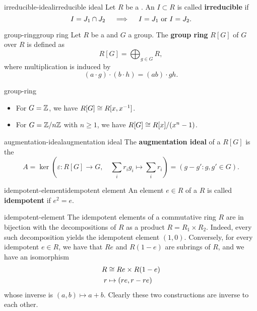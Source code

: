 \begin{topic}{irreducible-ideal}{irreducible ideal}
    Let $R$ be a . An  $I \subset R$ is called \textbf{irreducible} if
    \[ I = J_1 \cap J_2 \quad \implies \quad I = J_1 \textup{ or } I = J_2 . \]
\end{topic}

\begin{topic}{group-ring}{group ring}
    Let $R$ be a  and $G$ a group. The \textbf{group ring} $R[G]$ of $G$ over $R$ is defined as
    \[ R[G] = \bigoplus_{g \in G} R , \]
    where multiplication is induced by
    \[ (a \cdot g) \cdot (b \cdot h) = (ab) \cdot gh . \]
\end{topic}

\begin{example}{group-ring}
    \begin{itemize}
        \item For $G = \mathbb{Z}$, we have $R[G] \cong R[x, x^{-1}]$.
        \item For $G = \mathbb{Z}/n\mathbb{Z}$ with $n \ge 1$, we have $R[G] \cong R[x] / (x^n - 1)$.
    \end{itemize}
\end{example}

\begin{topic}{augmentation-ideal}{augmentation ideal}
    The \textbf{augmentation ideal} of a  $R[G]$ is the 
    \[ A = \ker\left( \varepsilon : R[G] \to G, \quad \sum_i r_i g_i \mapsto \sum_i r_i  \right) = (g - g' : g, g' \in G). \]
\end{topic}

\begin{topic}{idempotent-element}{idempotent element}
    An element $e \in R$ of a  $R$ is called \textbf{idempotent} if $e^2 = e$.
\end{topic}

\begin{example}{idempotent-element}
    The idempotent elements of a commutative ring $R$ are in bijection with the decompositions of $R$ as a product $R = R_1 \times R_2$. Indeed, every such decomposition yields the idempotent element $(1, 0)$. Conversely, for every idempotent $e \in R$, we have that $Re$ and $R(1 - e)$ are subrings of $R$, and we have an isomorphism
    \[ \begin{aligned}
        R &\cong Re \times R(1 - e) \\
        r &\mapsto (re, r - re)
    \end{aligned} \]
    whose inverse is $(a, b) \mapsto a + b$. Clearly these two constructions are inverse to each other.
\end{example}

